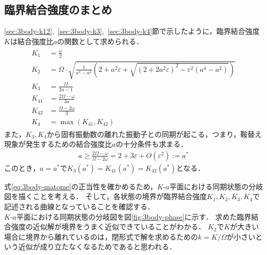 \documentclass[../main]{subfiles}
\begin{document}
    \subsection{臨界結合強度のまとめ}
    \ref{sec:3body-k12},\ \ref{sec:3body-k3},\ \ref{sec:3body-k4}節で示したように，臨界結合強度$K$は結合強度比$a$の関数として求められる．
    \begin{align}
        \label{eq:3body-matome}
        \begin{split}
            K_1&=\frac{\omega}{2}\\
            K_2&=\Omega\cdot\sqrt{\frac{1}{a^4-a^2}\left(2+a^2\varepsilon+\sqrt{(2+2a^2\varepsilon)^2-\varepsilon^2(a^4-a^2)}\right)}\\
            K_3&=\frac{\Omega}{2a-1}\\
            K_{41}&=\frac{2\Omega-\omega}{3a}\\
            K_{42}&=\frac{\Omega-2\omega}{3}\\
            K_4&=\max\left(K_{41},K_{42}\right)
        \end{split}
    \end{align}
    また，$K_3,K_4$から固有振動数の離れた振動子との同期が起こる，つまり，鞍替え現象が発生するための結合強度比$a$の十分条件も求まる．
    \begin{align*}
        a\geq \frac{2\Omega-\omega}{\Omega-2\omega}= 2+3\varepsilon+O(\varepsilon^2):=a^\ast    
    \end{align*}
    このとき，$a=a^\ast$で$K_{3}(a^\ast)=K_{41}(a^\ast)=K_{42}(a^\ast)$となる．
    
    式\eqref{eq:3body-matome}の正当性を確かめるため，$K$-$a$平面における同期状態の分岐図を描くことを考える．
    そして，各状態の境界が臨界結合強度$K_1,K_2,K_3,K_4$で記述される曲線となっていることを確認する．\\
    $K$-$a$平面における同期状態の分岐図を図\ref{fig:3body-phase}に示す．
    求めた臨界結合強度の近似解が境界をうまく近似できていることがわかる．
    $K_2$で$K$が大きい場合に境界から離れているのは，閉形式で解を求めるための$k=K/\Omega$が小さいという近似が成り立たなくなるためであると思われる．
\end{document}
